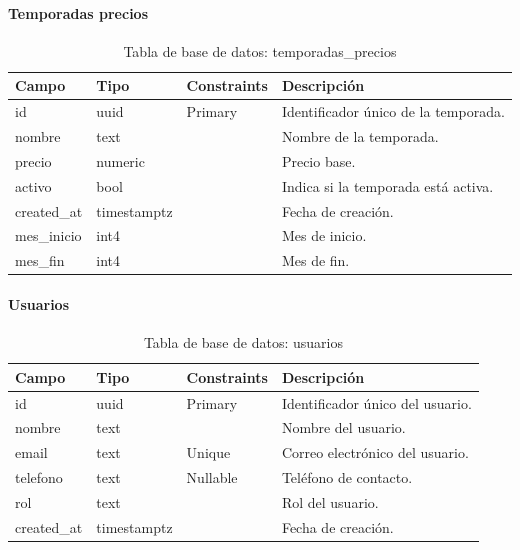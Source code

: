 \documentclass[11pt,a4paper]{article}
\begin{document}
\paragraph{Temporadas precios}
\begin{table}[H]
\centering
\small
\begin{tabularx}{\textwidth}{|p{2.5cm}|p{2.2cm}|p{3.2cm}|X|}
\hline
\textbf{Campo} & \textbf{Tipo} & \textbf{Constraints} & \textbf{Descripción} \\
\hline
id & uuid & Primary & Identificador único de la temporada. \\
\hline
nombre & text &  & Nombre de la temporada. \\
\hline
precio & numeric &  & Precio base. \\
\hline
activo & bool &  & Indica si la temporada está activa. \\
\hline
created\_at & timestamptz &  & Fecha de creación. \\
\hline
mes\_inicio & int4 &  & Mes de inicio. \\
\hline
mes\_fin & int4 &  & Mes de fin. \\
\hline
\end{tabularx}
\caption{Tabla de base de datos: temporadas\_precios}
\end{table}

\paragraph{Usuarios}
\begin{table}[H]
\centering
\small
\begin{tabularx}{\textwidth}{|p{2.5cm}|p{2.2cm}|p{3.2cm}|X|}
\hline
\textbf{Campo} & \textbf{Tipo} & \textbf{Constraints} & \textbf{Descripción} \\
\hline
id & uuid & Primary & Identificador único del usuario. \\
\hline
nombre & text &  & Nombre del usuario. \\
\hline
email & text & Unique & Correo electrónico del usuario. \\
\hline
telefono & text & Nullable & Teléfono de contacto. \\
\hline
rol & text &  & Rol del usuario. \\
\hline
created\_at & timestamptz &  & Fecha de creación. \\
\hline
\end{tabularx}
\caption{Tabla de base de datos: usuarios}
\end{table}
\end{document}
